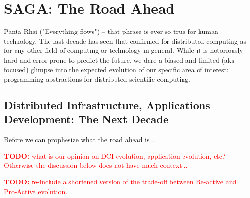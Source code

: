 \documentclass{article}
\newcommand{\I}[1]{\textit{#1}}
\newcommand{\B}[1]{\textbf{#1}}
\newcommand{\todo}[1]{{\textcolor{red}{\B{TODO:} #1 }}}
\newcommand{\jhanote}[1]{{\textcolor{red}{     \B{Shantenu:} #1 }}}
\newcommand{\jhanote}[1]{}
\begin{document}
\section{SAGA: The Road Ahead}
\label{sec:road}

 Panta Rhei ("Everything flows") -- that phrase is ever so true for human technology.
 The last decade has seen that confirmed for distributed computing as
 for any other field of computing or technology in general.  While it
 is notoriously hard and error prone to predict the future, we dare
 a biased and limited (aka focused) glimpse into the expected
 evolution of our specific area of interest: programming abstractions
 for distributed scientific computing. 

\subsection{Distributed Infrastructure, Applications Development: The Next Decade}
 Before we can prophesize what the road ahead is...

 \todo{what is our opinion on DCI evolution, application evolution,
   etc?  Otherwise the discussion below does not have much context...}



 \todo{re-include a shortened version of the trade-off between
 Re-active and Pro-Active evolution.}



\end{document}
